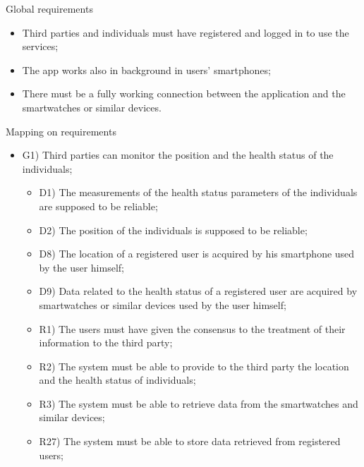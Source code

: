 \documentclass{article}
\begin{document}
\begin{legal}
\begin{legal}
			\item Global requirements\\
			\begin{itemize}
				\item Third parties and individuals must have registered and logged in to use the services;\\
				\item The app works also in background in users' smartphones;\\
				\item There must be a fully working connection between the application and the smartwatches or similar devices.\\
			\end{itemize}
			\begin{legal}
			\item Mapping on requirements\\
				\begin{itemize}
				\item G1) Third parties can monitor the position and the health status of the individuals;\\
				{\normalfont
					\begin{itemize}
					\item D1) The measurements of the health status parameters of the individuals are supposed to be reliable;\\
	 				\item D2) The position of the individuals is supposed to be reliable;\\
					\item D8) The location of a registered user is acquired by his smartphone used by the user himself;\\
					\item D9) Data related to the health status of a registered user are acquired by smartwatches or similar devices used by the user himself;\\
					\item R1) The users must have given the consensus to the treatment of their information to the third party;\\
					\item R2) The system must be able to provide to the third party the location and the health status of individuals;
					\item R3) The system must be able to retrieve data from the smartwatches and similar devices;\\
					\item R27) The system must be able to store data retrieved from registered users;\\

\end{itemize}}
\end{itemize}
\end{legal}
\end{legal}
\end{legal}
\end{document}
